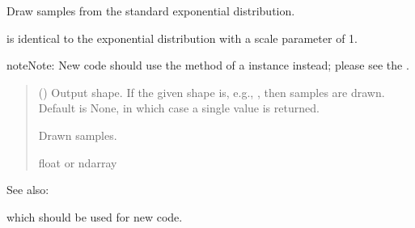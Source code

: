 \documentclass[letterpaper,10pt,english]{sphinxmanual}
\begin{document}

\begin{fulllineitems}
\label{\detokenize{metilda.controllers:metilda.controllers.pitch_art_wizard.standard_exponential}}
\pysigstartsignatures
{}
\pysigstopsignatures
\sphinxAtStartPar
Draw samples from the standard exponential distribution.

\sphinxAtStartPar
{} is identical to the exponential distribution
with a scale parameter of 1.

\begin{sphinxadmonition}{note}{Note:}
\sphinxAtStartPar
New code should use the
method of a  instance instead;
please see the .
\end{sphinxadmonition}
\begin{quote}\begin{description}
\sphinxAtStartPar
{} (\sphinxstyleliteralemphasis{\sphinxupquote{, }}) \textendash{} Output shape.  If the given shape is, e.g., , then
 samples are drawn.  Default is None, in which case a
single value is returned.

\sphinxAtStartPar
{} \textendash{} Drawn samples.

\sphinxAtStartPar
float or ndarray

\end{description}\end{quote}


\begin{sphinxseealso}{See also:}
\begin{description}
\sphinxAtStartPar
which should be used for new code.


\end{description}
\end{sphinxseealso}
\end{fulllineitems}
\end{document}

